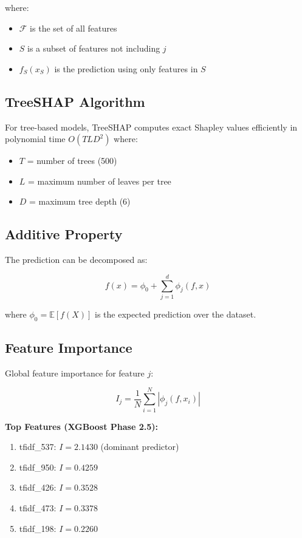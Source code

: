 \documentclass[12pt,a4paper]{article}
\begin{document}
where:
\begin{itemize}
    \item $\mathcal{F}$ is the set of all features
    \item $S$ is a subset of features not including $j$
    \item $f_S(x_S)$ is the prediction using only features in $S$
\end{itemize}

\subsection{TreeSHAP Algorithm}

For tree-based models, TreeSHAP computes exact Shapley values efficiently in polynomial time $O(TLD^2)$ where:
\begin{itemize}
    \item $T$ = number of trees (500)
    \item $L$ = maximum number of leaves per tree
    \item $D$ = maximum tree depth (6)
\end{itemize}

\subsection{Additive Property}

The prediction can be decomposed as:

$$f(x) = \phi_0 + \sum_{j=1}^{d} \phi_j(f, x)$$

where $\phi_0 = \mathbb{E}[f(X)]$ is the expected prediction over the dataset.

\subsection{Feature Importance}

Global feature importance for feature $j$:

$$I_j = \frac{1}{N} \sum_{i=1}^{N} |\phi_j(f, x_i)|$$

\textbf{Top Features (XGBoost Phase 2.5):}
\begin{enumerate}
    \item tfidf\_537: $I = 2.1430$ (dominant predictor)
    \item tfidf\_950: $I = 0.4259$
    \item tfidf\_426: $I = 0.3528$
    \item tfidf\_473: $I = 0.3378$
    \item tfidf\_198: $I = 0.2260$
\end{enumerate}
\end{document}
